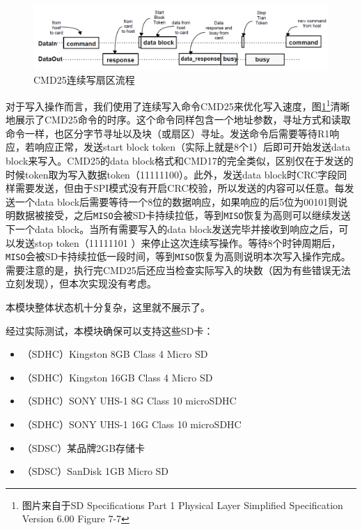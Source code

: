 \documentclass[11pt,utf8]{report}
\begin{document}
	\begin{figure}[h!]
		\centering
		\includegraphics[width=\textwidth]{cmd25}
		\caption{CMD25连续写扇区流程}
		\label{cmd25}
	\end{figure}
	
	\par 对于写入操作而言，我们使用了连续写入命令CMD25来优化写入速度，图\ref{cmd25}\footnote{图片来自于SD Specifications Part 1 Physical Layer Simplified Specification Version 6.00 Figure 7-7}清晰地展示了CMD25命令的时序。这个命令同样包含一个地址参数，寻址方式和读取命令一样，也区分字节寻址以及块（或扇区）寻址。发送命令后需要等待R1响应，若响应正常，发送start block token（实际上就是8个1）后即可开始发送data block来写入。CMD25的data block格式和CMD17的完全类似，区别仅在于发送的时候token取为写入数据token（11111100）。此外，发送data block时CRC字段同样需要发送，但由于SPI模式没有开启CRC校验，所以发送的内容可以任意。每发送一个data block后需要等待一个8位的数据响应，如果响应的后5位为00101则说明数据被接受，之后\texttt{MISO}会被SD卡持续拉低，等到\texttt{MISO}恢复为高则可以继续发送下一个data block。当所有需要写入的data block发送完毕并接收到响应之后，可以发送stop token（11111101 ）来停止这次连续写操作。等待8个时钟周期后，\texttt{MISO}会被SD卡持续拉低一段时间，等到\texttt{MISO}恢复为高则说明本次写入操作完成。需要注意的是，执行完CMD25后还应当检查实际写入的块数（因为有些错误无法立刻发现），但本次实现没有考虑。
	
	\par 本模块整体状态机十分复杂，这里就不展示了。
	
	\par 经过实际测试，本模块确保可以支持这些SD卡：
	
	\begin{itemize}
		\item （SDHC）Kingston 8GB Class 4 Micro SD
		\item （SDHC）Kingston 16GB Class 4 Micro SD
		\item （SDHC）SONY UHS-1 8G Class 10 microSDHC
		\item （SDHC）SONY UHS-1 16G Class 10 microSDHC
		\item （SDSC）某品牌2GB存储卡
		\item （SDSC）SanDisk 1GB Micro SD
	\end{itemize}
	
\end{document}
